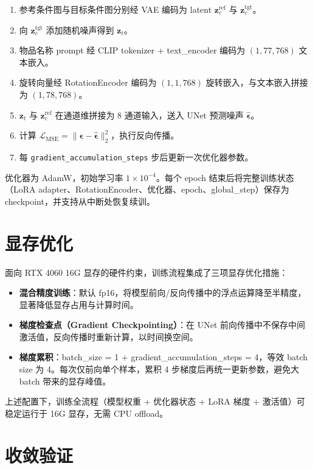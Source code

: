 \begin{enumerate}[label=(\arabic*)]
    \item 参考条件图与目标条件图分别经 VAE 编码为 latent $\mathbf{z}_c^{\text{ref}}$ 与 $\mathbf{z}_c^{\text{tgt}}$。
    \item 向 $\mathbf{z}_c^{\text{tgt}}$ 添加随机噪声得到 $\mathbf{z}_t$。
    \item 物品名称 prompt 经 CLIP tokenizer + text\_encoder 编码为 $(1, 77, 768)$ 文本嵌入。
    \item 旋转向量经 RotationEncoder 编码为 $(1, 1, 768)$ 旋转嵌入，与文本嵌入拼接为 $(1, 78, 768)$。
    \item $\mathbf{z}_t$ 与 $\mathbf{z}_c^{\text{ref}}$ 在通道维拼接为 8 通道输入，送入 UNet 预测噪声 $\hat{\boldsymbol{\epsilon}}$。
    \item 计算 $\mathcal{L}_{\text{MSE}} = \|\boldsymbol{\epsilon} - \hat{\boldsymbol{\epsilon}}\|_2^2$，执行反向传播。
    \item 每 \texttt{gradient\_accumulation\_steps} 步后更新一次优化器参数。
\end{enumerate}

优化器为 AdamW，初始学习率 $1 \times 10^{-4}$。每个 epoch 结束后将完整训练状态（LoRA adapter、RotationEncoder、优化器、epoch、global\_step）保存为 checkpoint，并支持从中断处恢复续训。

\section{显存优化}

面向 RTX 4060 16G 显存的硬件约束，训练流程集成了三项显存优化措施：

\begin{itemize}
    \item \textbf{混合精度训练}：默认 fp16，将模型前向/反向传播中的浮点运算降至半精度，显著降低显存占用与计算时间。
    \item \textbf{梯度检查点（Gradient Checkpointing）}：在 UNet 前向传播中不保存中间激活值，反向传播时重新计算，以时间换空间。
    \item \textbf{梯度累积}：batch\_size = 1 + gradient\_accumulation\_steps = 4，等效 batch size 为 4。每次仅前向单个样本，累积 4 步梯度后再统一更新参数，避免大 batch 带来的显存峰值。
\end{itemize}

上述配置下，训练全流程（模型权重 + 优化器状态 + LoRA 梯度 + 激活值）可稳定运行于 16G 显存，无需 CPU offload。

\section{收敛验证}

